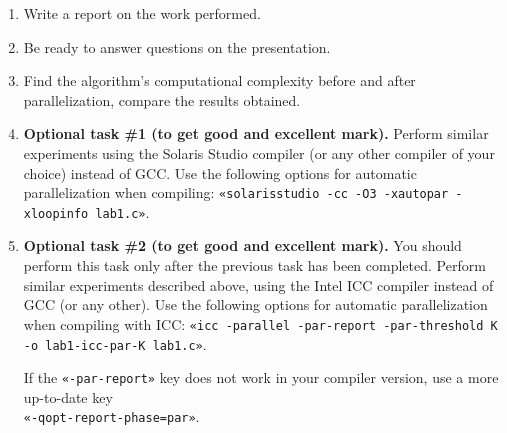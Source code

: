 {\begin{enumerate}
\begin{itemize}
				\item run lab1-seq for values \\$N\;=\;{N1,\;N1+\Delta,\;N1+2\Delta,\;N1+3\Delta,…,\;N2}$ and write the resulting  delta\textunderscore ms(N) time values to the $seq(N)$ function;
				\item run lab1-par-K for values \\$N\;=\;{N1,\;N1+\Delta,\;N1+2\Delta,\;N1+3\Delta,…,\;N2}$ and write the resulting delta\textunderscore ms(N) time values to the $par-K(N)$ function;
				\item choose the value of $\Delta$: $\Delta\;=\;(N2\;-\;N1)/10$.
			\end{itemize}
		\item Write a report on the work performed.
		\item Be ready to answer questions on the presentation.
		\item Find the algorithm's computational complexity before and after parallelization, compare the results obtained.
		\sloppy
		\item\textbf{Optional task \#1 (to get good and excellent mark).} Perform similar experiments using the Solaris Studio compiler (or any other compiler of your choice) instead of GCC. Use the following options for automatic parallelization when compiling: \verb+«solarisstudio -cc -O3 -xautopar -xloopinfo lab1.c»+.
 		\item\textbf{Optional task \#2 (to get good and excellent mark).} You should perform this task only after the previous task has been completed. Perform similar experiments described above, using the Intel ICC compiler instead of GCC (or any other). Use the following options for automatic parallelization when compiling with ICC: \verb+«icc -parallel -par-report -par-threshold K -o lab1-icc-par-K lab1.c»+.
			\par If the \verb+«-par-report»+ key does not work in your compiler version, use a more up-to-date key \\\verb+«-qopt-report-phase=par»+.
	\end{enumerate}
	
}